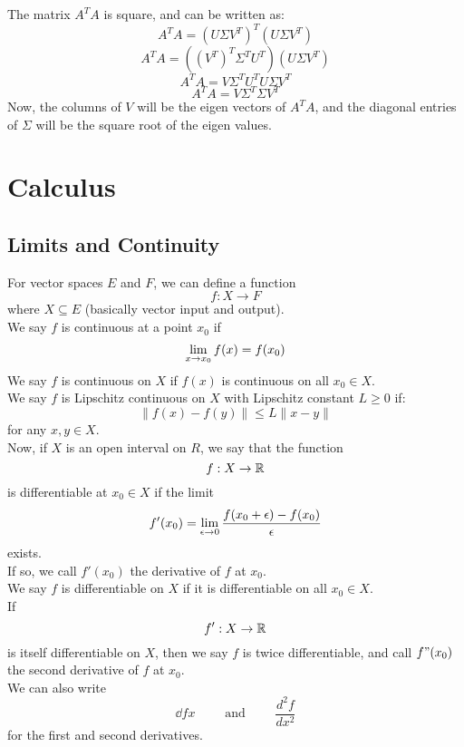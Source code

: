 \documentclass[12pt]{article}
\begin{document}
    The matrix $A^TA$ is square, 
    and can be written as:
    \[A^TA =  (U\Sigma V^T)^T(U\Sigma V^T)\]
    \[A^TA =  ((V^T)^T\Sigma^TU^T)(U\Sigma V^T)\]
    \[A^TA =  V\Sigma^TU^TU\Sigma V^T \]
    \[A^TA =  V\Sigma^T\Sigma V^T\]
    Now, the columns of $V$
    will be the eigen vectors of $A^TA$,
    and the diagonal entries of $\Sigma$
    will be the square root of the eigen values. \\
 
    \newpage

    \section*{Calculus}

    \subsection*{Limits and Continuity}

    For vector spaces $E$ and $F$,
    we can define a function
    \[ f: X \to F \]
    where $X \subseteq E$
    (basically vector input and output). \\

    We say $f$ is continuous at a point $x_0$
    if
    \[ \lim_{x \to x_0} f(x) = f(x_0) \]
    We say $f$ is continuous on $X$
    if $f(x)$ is continuous on all $x_0 \in X$. \\

    We say $f$ is Lipschitz continuous on $X$
    with Lipschitz constant $L \geq 0$ if: 
    \[ \| f(x) - f(y) \| \leq L \| x - y \| \]
    for any $x, y \in X$. \\

    Now, if $X$ is an open interval on $R$,
    we say that the function
    \[ f: X \to \mathbb{R} \]
    is differentiable at $x_0 \in X$ if the limit
    \[ f'(x_0) = \lim_{\epsilon \to 0} 
        \dfrac{f(x_0+\epsilon) - f(x_0)}{\epsilon}
   \]
    exists. \\
    If so, we call $f'(x_0)$
    the derivative of $f$ at $x_0$. \\
    We say $f$ is differentiable on $X$
    if it is differentiable on all $x_0 \in X$. \\

    If
    \[f': X \to \mathbb{R} \]
    is itself differentiable on $X$,
    then we say $f$ is twice differentiable,
    and call $f"(x_0)$ the second derivative
    of $f$ at $x_0$. \\

    We can also write
    \[ \dd{f}{x} \qquad \text{ and } \qquad \dfrac{d^2f}{dx^2} \]
    for the first and second derivatives. \\
\end{document}
